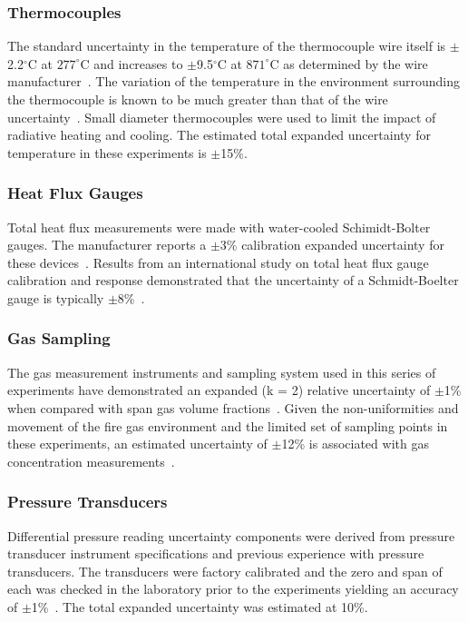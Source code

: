 \documentclass[12pt,oneside]{book}
\begin{document}
\subsubsection{Thermocouples}
The standard uncertainty in the temperature of the thermocouple wire itself is $\pm$2.2$^{\circ}$C at $277^{\circ}$C and increases to $\pm$9.5$^{\circ}$C at $871^{\circ}$C as determined by the wire manufacturer~\cite{Omega:2004}. The variation of the temperature in the environment surrounding the thermocouple is known to be much greater than that of the wire uncertainty~\cite{Blevins:1999,Pitts:2003}. Small diameter thermocouples were used to limit the impact of radiative heating and cooling. The estimated total expanded uncertainty for temperature in these experiments is $\pm$15\%.

\subsubsection{Heat Flux Gauges}
Total heat flux measurements were made with water-cooled Schimidt-Bolter gauges. The manufacturer reports a $\pm$3\% calibration expanded uncertainty for these devices~\cite{Medtherm:2003}. Results from an international study on total heat flux gauge calibration and response demonstrated that the uncertainty of a Schmidt-Boelter gauge is typically $\pm$8\%~\cite{Pitts:2006}.

\subsubsection{Gas Sampling}
The gas measurement instruments and sampling system used in this series of experiments have demonstrated an expanded (k = 2) relative uncertainty of $\pm$1\% when compared with span gas volume fractions~\cite{Bundy:2007}. Given the non-uniformities and movement of the fire gas environment and the limited set of sampling points in these experiments, an estimated uncertainty of $\pm$12\% is associated with gas concentration measurements~\cite{Lock:1}.

\subsubsection{Pressure Transducers}
Differential pressure reading uncertainty components were derived from pressure transducer instrument specifications and previous experience with pressure transducers. The transducers were factory calibrated and the zero and span of each was checked in the laboratory prior to the experiments yielding an accuracy of $\pm$1\%~\cite{Setra:2002}. The total expanded uncertainty was estimated at 10\%.
\end{document}
